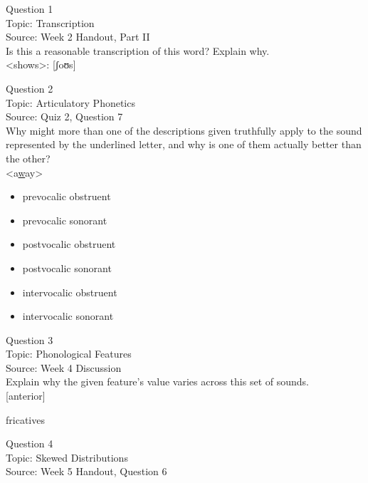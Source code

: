 \documentclass[12pt]{article}
\begin{document}
{\large Question 1}\\

Topic: Transcription\\
Source: Week 2 Handout, Part II\\

Is this a reasonable transcription of this word? Explain why.\\

<shows>: {[ʃoʊs]}


\newpage

{\large Question 2}\\

Topic: Articulatory Phonetics\\
Source: Quiz 2, Question 7\\

Why might more than one of the descriptions given truthfully apply to the sound represented by the underlined letter, and why is one of them actually better than the other?\\

<a\underline{w}ay>

\begin{itemize} \item prevocalic obstruent \item prevocalic sonorant \item postvocalic obstruent \item postvocalic sonorant \item intervocalic obstruent \item intervocalic sonorant \end{itemize}


\newpage

{\large Question 3}\\

Topic: Phonological Features\\
Source: Week 4 Discussion\\

Explain why the given feature's value varies across this set of sounds.\\

{[anterior]}

fricatives


\newpage

{\large Question 4}\\

Topic: Skewed Distributions\\
Source: Week 5 Handout, Question 6\\
\end{document}
